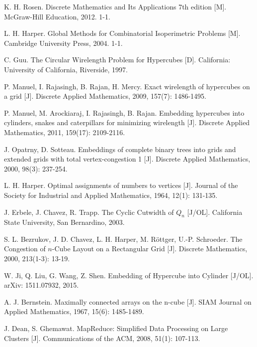 
\begin{thebibliography}{99}

	K. H. Rosen.
	Discrete Mathematics and Its Applications 7th edition [M].
	McGraw-Hill Education, 2012. 1-1. %

	L. H. Harper.
	Global Methods for Combinatorial Isoperimetric Problems [M].
	Cambridge University Press, 2004. 1-1. %

	C. Guu.
	The Circular Wirelength Problem for Hypercubes [D].
	California: University of California, Riverside, 1997.

	P. Manuel, I. Rajasingh, B. Rajan, H. Mercy.
	Exact wirelength of hypercubes on a grid [J].
	Discrete Applied Mathematics, 2009, 157(7): 1486-1495.

	P. Manuel, M. Arockiaraj, I. Rajasingh, B. Rajan.
	Embedding hypercubes into cylinders, snakes and caterpillars for
	minimizing wirelength [J].
	Discrete Applied Mathematics, 2011, 159(17): 2109-2116.

	J. Opatrny, D. Sotteau.
	Embeddings of complete binary trees into grids and extended grids
	with total vertex-congestion 1 [J].
	Discrete Applied Mathematics, 2000, 98(3): 237-254.

	L. H. Harper.
	Optimal assignments of numbers to vertices [J].
	Journal of the Society for Industrial and Applied Mathematics,
	1964, 12(1): 131-135.

	J. Erbele, J. Chavez, R. Trapp.
	The Cyclic Cutwidth of $Q_n$ [J/OL].
	California State University, San Bernardino, 2003.

	S. L. Bezrukov, J. D. Chavez, L. H. Harper, M. Röttger, U.-P. Schroeder.
	The Congestion of $n$-Cube Layout on a Rectangular Grid [J].
	Discrete Mathematics, 2000, 213(1-3): 13-19.

	W. Ji, Q. Liu, G. Wang, Z. Shen.
	Embedding of Hypercube into Cylinder [J/OL].
	arXiv: 1511.07932, 2015.

	A. J. Bernstein.
	Maximally connected arrays on the n-cube [J].
	SIAM Journal on Applied Mathematics, 1967, 15(6): 1485-1489.

	J. Dean, S. Ghemawat.
	MapReduce: Simplified Data Processing on Large Clusters [J].
	Communications of the ACM, 2008, 51(1): 107-113.

\end{thebibliography}
